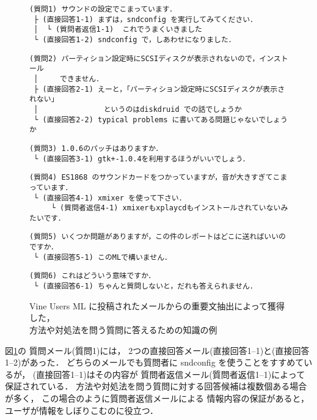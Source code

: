 \begin{figure}[t]
\begin{verbatim}
(質問1) サウンドの設定でこまっています．
 ├ (直接回答1-1) まずは，sndconfig を実行してみてください．
 │  └ (質問者返信1-1)  これでうまくいきました
 └ (直接回答1-2) sndconfig で，しあわせになりました．

\end{verbatim}

\begin{verbatim}
(質問2) パーティション設定時にSCSIディスクが表示されないので，インストール
 │     できません．
 ├ (直接回答2-1) えーと，「パーティション設定時にSCSIディスクが表示されない」
 │               というのはdiskdruid での話でしょうか
 └ (直接回答2-2) typical problems に書いてある問題じゃないでしょうか

\end{verbatim}

\begin{verbatim}
(質問3) 1.0.6のパッチはありますか．
 └ (直接回答3-1) gtk+-1.0.4を利用するほうがいいでしょう．

\end{verbatim}

\begin{verbatim}
(質問4) ES1868 のサウンドカードをつかっていますが，音が大きすぎてこまっています．
 └ (直接回答4-1) xmixer を使って下さい．
     └ (質問者返信4-1) xmixerもxplaycdもインストールされていないみたいです．

\end{verbatim}

\begin{verbatim}
(質問5) いくつか問題がありますが，この件のレポートはどこに送ればいいのですか．
 └ (直接回答5-1) このMLで構いません．

\end{verbatim}

\begin{verbatim}
(質問6) これはどういう意味ですか．
 └ (直接回答6-1) ちゃんと質問しないと，だれも答えられません．	

\end{verbatim}

   \caption{Vine Users ML に投稿されたメールからの重要文抽出によって獲得した，\\
 方法や対処法を問う質問に答えるための知識の例}
   \label{fig:vine linux ML から取り出した知識の例}
\end{figure}


図\ref{fig:vine linux ML から取り出した知識の例}の
質問メール(質問1)には，
2つの直接回答メール(直接回答1--1)と(直接回答1--2)があった．
どちらのメールでも質問者に sndconfig を使うことをすすめているが，
(直接回答1--1)はその内容が
質問者返信メール(質問者返信1--1)によって保証されている．
方法や対処法を問う質問に対する回答候補は複数個ある場合が多く，
この場合のように質問者返信メールによる
情報内容の保証があると，
ユーザが情報をしぼりこむのに役立つ．


